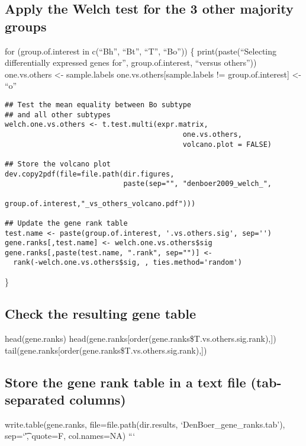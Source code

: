 \subsection{Apply the Welch test for the 3 other majority
groups}\label{apply-the-welch-test-for-the-3-other-majority-groups}

for (group.of.interest in c(``Bh'', ``Bt'', ``T'', ``Bo'')) \{
print(paste(``Selecting differentially expressed genes for'',
group.of.interest, ``versus others'')) one.vs.others \textless{}-
sample.labels one.vs.others{[}sample.labels != group.of.interest{]}
\textless{}- ``o''

\begin{verbatim}
## Test the mean equality between Bo subtype
## and all other subtypes
welch.one.vs.others <- t.test.multi(expr.matrix,
                                          one.vs.others,
                                          volcano.plot = FALSE)

## Store the volcano plot
dev.copy2pdf(file=file.path(dir.figures,
                            paste(sep="", "denboer2009_welch_",
                                 group.of.interest,"_vs_others_volcano.pdf")))

## Update the gene rank table
test.name <- paste(group.of.interest, '.vs.others.sig', sep='')
gene.ranks[,test.name] <- welch.one.vs.others$sig
gene.ranks[,paste(test.name, ".rank", sep="")] <-
  rank(-welch.one.vs.others$sig, , ties.method='random')
\end{verbatim}

\}

\subsection{Check the resulting gene
table}\label{check-the-resulting-gene-table}

head(gene.ranks)
head(gene.ranks{[}order(gene.ranks\$T.vs.others.sig.rank),{]})
tail(gene.ranks{[}order(gene.ranks\$T.vs.others.sig.rank),{]})

\subsection{Store the gene rank table in a text file (tab-separated
columns)}\label{store-the-gene-rank-table-in-a-text-file-tab-separated-columns}

write.table(gene.ranks, file=file.path(dir.results,
`DenBoer\_gene\_ranks.tab'), sep=`\t', quote=F, col.names=NA) ```

